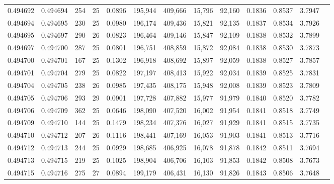 \begin{tabular}{rrrrrrrrrrrrr}
0.494692 & 0.494694 & 254 &  25 &                                     0.0896 & 195,944 & 409,666 &  15,796 &  92,160 & 0.1836 & 0.8537 & 3.7947 \\
0.494694 & 0.494695 & 230 &  25 &                                     0.0980 & 196,174 & 409,436 &  15,821 &  92,135 & 0.1837 & 0.8534 & 3.7926 \\
0.494695 & 0.494697 & 290 &  26 &                                     0.0823 & 196,464 & 409,146 &  15,847 &  92,109 & 0.1838 & 0.8532 & 3.7899 \\
0.494697 & 0.494700 & 287 &  25 &                                     0.0801 & 196,751 & 408,859 &  15,872 &  92,084 & 0.1838 & 0.8530 & 3.7873 \\
0.494700 & 0.494701 & 167 &  25 &                                     0.1302 & 196,918 & 408,692 &  15,897 &  92,059 & 0.1838 & 0.8527 & 3.7857 \\
0.494701 & 0.494704 & 279 &  25 &                                     0.0822 & 197,197 & 408,413 &  15,922 &  92,034 & 0.1839 & 0.8525 & 3.7831 \\
0.494704 & 0.494705 & 238 &  26 &                                     0.0985 & 197,435 & 408,175 &  15,948 &  92,008 & 0.1839 & 0.8523 & 3.7809 \\
0.494705 & 0.494706 & 293 &  29 &                                     0.0901 & 197,728 & 407,882 &  15,977 &  91,979 & 0.1840 & 0.8520 & 3.7782 \\
0.494706 & 0.494709 & 362 &  25 &                                     0.0646 & 198,090 & 407,520 &  16,002 &  91,954 & 0.1841 & 0.8518 & 3.7749 \\
0.494709 & 0.494710 & 144 &  25 &                                     0.1479 & 198,234 & 407,376 &  16,027 &  91,929 & 0.1841 & 0.8515 & 3.7735 \\
0.494710 & 0.494712 & 207 &  26 &                                     0.1116 & 198,441 & 407,169 &  16,053 &  91,903 & 0.1841 & 0.8513 & 3.7716 \\
0.494712 & 0.494713 & 244 &  25 &                                     0.0929 & 198,685 & 406,925 &  16,078 &  91,878 & 0.1842 & 0.8511 & 3.7694 \\
0.494713 & 0.494715 & 219 &  25 &                                     0.1025 & 198,904 & 406,706 &  16,103 &  91,853 & 0.1842 & 0.8508 & 3.7673 \\
0.494715 & 0.494716 & 275 &  27 &                                     0.0894 & 199,179 & 406,431 &  16,130 &  91,826 & 0.1843 & 0.8506 & 3.7648 \\

\end{tabular}
